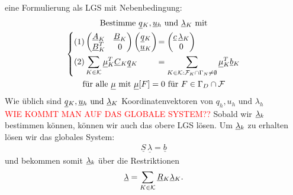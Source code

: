 eine Formulierung als LGS mit Nebenbedingung:
\begin{gather*}
	\text{Bestimme } \underline{q}{}_K, \underline{u}{}_h \text{ und } \underline{\lambda}{}_K \text{ mit}\\
	\begin{dcases}
		(1) \begin{pmatrix}
			\underline{A}_K & \underline{B}_K \\
			\underline{B}_K^T & 0
		\end{pmatrix}
		\begin{pmatrix}
			\underline{q}{}_K\\
			\underline{u}{}_K
		\end{pmatrix}
		\mkern-16mu&= \begin{pmatrix}
			\underline{c} \, \underline{\lambda}{}_K \\
			0
		\end{pmatrix}\\
		(2) \sum_{K \in \mathcal{K}}  \underline{\mu}{}_K^T \underline{C}{}_K \underline{q}{}_K \mkern-16mu&= \sum_{K \in \mathcal{K}: \mathcal{F}_K\cap \Gamma_N \ne \emptyset} \underline{\mu}{}_K^T \underline{b}{}_K		
	\end{dcases}\\
	\text{für alle } \underline{\mu}{} \text{ mit } \underline{\mu}{}[F] = 0 \text{ für } F \in \Gamma_D \cap \mathcal{F}
\end{gather*}  
Wie üblich sind $ \underline{q}{}_K, \underline{u}{}_h \text{ und } \underline{\lambda}{}_K $ Koordinatenvektoren von $ q_h, u_h \text{ und } \lambda_h $\\
\textcolor{red}{WIE KOMMT MAN AUF DAS GLOBALE SYSTEM??}
Sobald wir $ \underline{\lambda}{}_k $ bestimmen können, können wir auch das obere LGS lösen. Um $ \underline{\lambda}{}_k $ zu erhalten lösen wir das globales System:
\begin{gather*}
	\underline{S} \, \underline{\lambda} = \underline{b}
\end{gather*}
und bekommen somit $ \underline{\lambda}{}_k $ über die Restriktionen
\[ \underline{\lambda}{} = \sum_{K \in \mathcal{K}} \underline{R}{}_K \underline{\lambda}{}_K .\]



